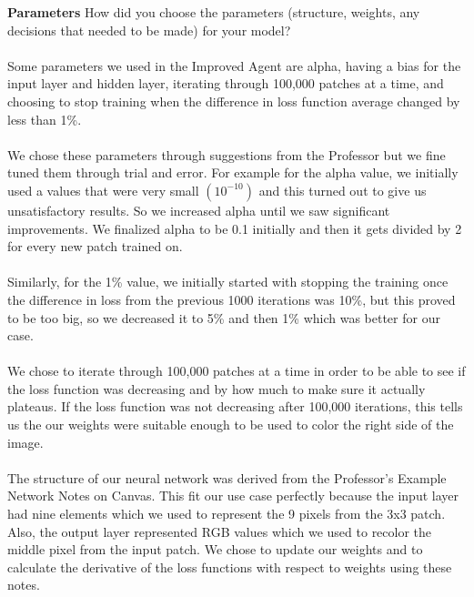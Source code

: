 \documentclass{article}
\theoremstyle{definition}
\begin{document}
    \textbf{Parameters}
        How did you choose the parameters (structure, weights, any decisions that needed to be made) for your model? \\\\
        Some parameters we used in the Improved Agent are alpha, having a bias for the input layer and hidden layer, iterating through 100,000 patches at a time, and choosing to stop training when the difference in loss function average changed by less than 1\%. \\\\
        We chose these parameters through suggestions from the Professor but we fine tuned them through trial and error. For example for the alpha value, we initially used a values that were very small $(10^{-10})$ and this turned out to give us unsatisfactory results. So we increased alpha until we saw significant improvements. We finalized alpha to be 0.1 initially and then it gets divided by 2 for every new patch trained on. \\\\
        Similarly, for the 1\% value, we initially started with stopping the training once the difference in loss from the previous 1000 iterations was 10\%, but this proved to be too big, so we decreased it to 5\% and then 1\% which was better for our case. \\\\
        We chose to iterate through 100,000 patches at a time in order to be able to see if the loss function was decreasing and by how much to make sure it actually plateaus. If the loss function was not decreasing after 100,000 iterations, this tells us the our weights were suitable enough to be used to color the right side of the image. \\\\
        The structure of our neural network was derived from the Professor's Example Network Notes on Canvas. This fit our use case perfectly because the input layer had nine elements which we used to represent the 9 pixels from the 3x3 patch. Also, the output layer represented RGB values which we used to recolor the middle pixel from the input patch. We chose to update our weights and to calculate the derivative of the loss functions with respect to weights using these notes.
        
\end{document}

